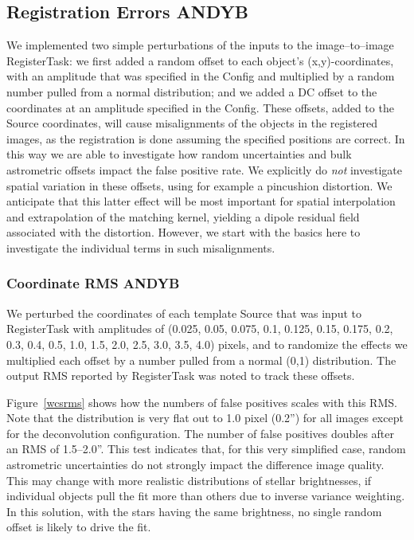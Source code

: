 \documentclass[prd, nofootinbib, floatfix, 11pt,tightenlines,times]{article}
\begin{document}
\subsection{Registration Errors {\bf ANDYB}}

We implemented two simple perturbations of the inputs to the
image--to--image RegisterTask: we first added a random offset to each
object's (x,y)-coordinates, with an amplitude that was specified in
the Config and multiplied by a random number pulled from a normal
distribution; and we added a DC offset to the coordinates at an
amplitude specified in the Config.  These offsets, added to the Source
coordinates, will cause misalignments of the objects in the registered
images, as the registration is done assuming the specified positions
are correct.  In this way we are able to investigate how random
uncertainties and bulk astrometric offsets impact the false positive
rate.  We explicitly do {\it not} investigate spatial variation in
these offsets, using for example a pincushion distortion.  We
anticipate that this latter effect will be most important for spatial
interpolation and extrapolation of the matching kernel, yielding a
dipole residual field associated with the distortion.  However, we
start with the basics here to investigate the individual terms in such
misalignments.

\subsubsection{Coordinate RMS {\bf ANDYB}}

We perturbed the coordinates of each template Source that was input to
RegisterTask with amplitudes of (0.025, 0.05, 0.075, 0.1, 0.125, 0.15,
0.175, 0.2, 0.3, 0.4, 0.5, 1.0, 1.5, 2.0, 2.5, 3.0, 3.5, 4.0) pixels,
and to randomize the effects we multiplied each offset by a number
pulled from a normal (0,1) distribution.  The output RMS reported by
RegisterTask was noted to track these offsets.  

Figure~\ref{wcsrms} shows how the numbers of false positives scales
with this RMS.  Note that the distribution is very flat out to 1.0
pixel (0.2'') for all images except for the deconvolution
configuration.  The number of false positives doubles after an RMS of
1.5--2.0''.  This test indicates that, for this very simplified case,
random astrometric uncertainties do not strongly impact the difference
image quality.  This may change with more realistic distributions of
stellar brightnesses, if individual objects pull the fit more than
others due to inverse variance weighting.  In this solution, with the
stars having the same brightness, no single random offset is likely to
drive the fit.
\end{document}
